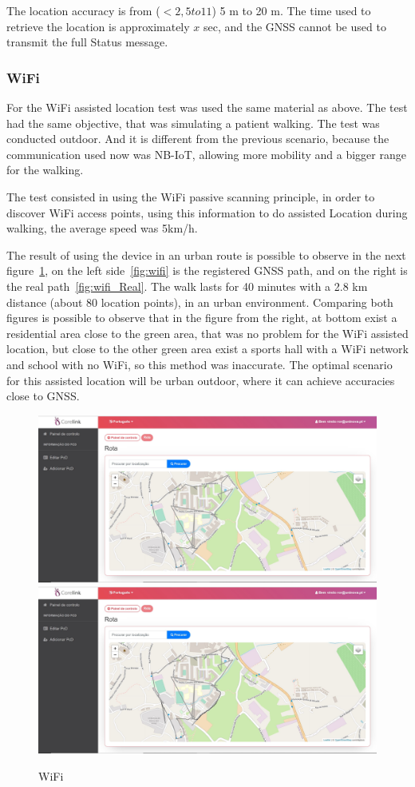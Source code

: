 The location accuracy is from ($<2,5 to 11$) 5 m to 20 m. The time used to retrieve the location is approximately $x$ sec, and the GNSS cannot be used to transmit the full Status message.

\subsubsection{WiFi}
\label{subsubsec:WiFi}
For the WiFi assisted location test was used the same material as above. The test had the same objective, that was simulating a patient walking. The test was conducted outdoor. And it is different from the previous scenario, because the communication used now was NB-IoT, allowing more mobility and a bigger range for the walking.

The test consisted in using the WiFi passive scanning principle, in order to discover WiFi access points, using this information to do assisted Location during walking, the average speed was 5km/h. 

The result of using the device in an urban route is possible to observe in the next figure~\ref{fig:WiFi_Results}, on the left side~\ref{fig:wifi} is the registered GNSS path, and on the right is the real path~\ref{fig:wifi_Real}.  The walk lasts for 40 minutes with a 2.8 km distance (about 80 location points), in an urban environment. Comparing both figures is possible to observe that in the figure from the right, at bottom exist a residential area close to the green area, that was no problem for the WiFi assisted location, but close to the other green area exist a sports hall with a WiFi network and school with no WiFi, so this method was inaccurate. The optimal scenario for this assisted location will be urban outdoor, where it can achieve accuracies close to GNSS.

\begin{figure}[htbp]
  \centering
    {\includegraphics[width=0.5\linewidth]{Chapters/Figures/wifi.JPG}}%
    {\includegraphics[width=0.5\linewidth]{Chapters/Figures/wifireal.JPG}}%
  \caption{WiFi }
  \label{fig:WiFi_Results}
\end{figure}

